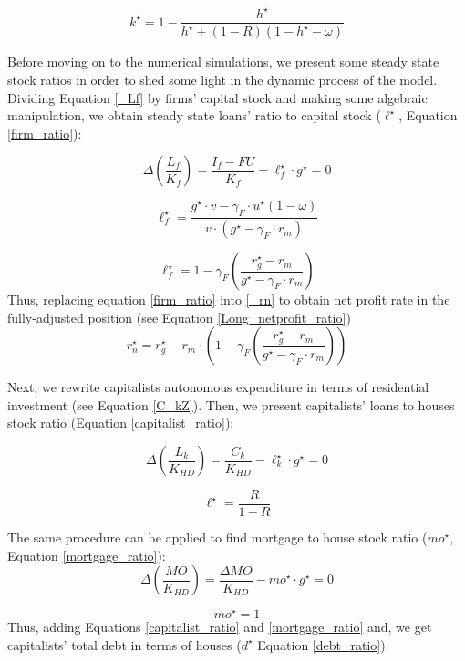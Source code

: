 \documentclass[11pt]{article}
\begin{document}
\begin{equation}
\label{k_long}
k^{\star} = 1 - \frac{h^{\star}}{h^\star + (1-R)(1-h^\star - \omega)}
\end{equation}



Before moving on to the numerical simulations, we present some steady state stock ratios in order to shed some light in the dynamic process of the model. Dividing Equation \ref{_Lf} by firms' capital stock and making some algebraic manipulation, we obtain steady state loans' ratio to capital stock (\(\ell^{\star}\), Equation \ref{firm_ratio}):

$$
\Delta \left(\frac{L_{f}}{K_{f}}\right) = \frac{I_{f} - FU}{K_{f}} - \ell^{\star}_{f}\cdot g^{\star}  = 0
$$

$$
    \ell_f^\star = \frac{g^\star\cdot v - \gamma_F\cdot u^\star (1-\omega)}{v\cdot (g^\star - \gamma_F\cdot r_m)}
$$

\begin{equation}
\label{firm_ratio}
\ell_f^\star = 1 - \gamma_F\left(\frac{r_g^\star - r_m}{g^\star - \gamma_F\cdot r_m}\right)
\end{equation}
Thus, replacing equation \ref{firm_ratio} into \ref{_rn} to obtain net profit rate in the fully-adjusted position (see Equation \ref{Long_netprofit_ratio})
\begin{equation}
\label{Long_netprofit_ratio}
r_n^\star = r_g^\star - r_m\cdot \left(1 - \gamma_F\left(\frac{r_g^\star - r_m}{g^\star - \gamma_F\cdot r_m}\right)\right)
\end{equation}



Next, we rewrite capitalists autonomous expenditure in terms of residential investment (see Equation \ref{C_kZ}). 
Then, we  present capitalists' loans to houses stock ratio (Equation \ref{capitalist_ratio}):

$$
\Delta \left(\frac{L_k}{K_{HD}}\right) = \frac{C_k}{K_{HD}} - \ell^{\star}_{k}\cdot g^{\star} = 0
$$

\begin{equation}
\label{capitalist_ratio}
\ell^\star = \frac{R}{1-R}
\end{equation}

The same procedure can be applied to find mortgage to house stock ratio (\(mo^{\star}\), Equation \ref{mortgage_ratio}):
$$
\Delta \left(\frac{MO}{K_{HD}}\right) = \frac{\Delta MO}{K_{HD}} - mo^{\star}\cdot g^{\star} = 0
$$

\begin{equation}
\label{mortgage_ratio}
mo^\star = 1
\end{equation}
Thus, adding Equations \ref{capitalist_ratio} and \ref{mortgage_ratio} and, we get capitalists' total debt in terms of houses (\(d^\star\) Equation \ref{debt_ratio})
\end{document}
